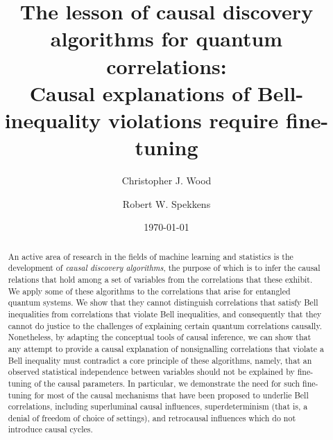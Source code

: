 \documentclass[letterpaper,onecolumn,nofootinbib]{revtex4}
\begin{document}
\title{The lesson of causal discovery algorithms for quantum correlations: \\ Causal explanations of Bell-inequality violations require fine-tuning}
\author{Christopher J. Wood}
\author{Robert W. Spekkens}
\date{\today}


\begin{abstract}
An active area of research in the fields of machine learning and statistics is the
development of \emph{causal discovery algorithms}, the purpose of which is
to infer the causal relations that hold among a set of variables from the
correlations that these exhibit. We apply some of these algorithms to the
correlations that arise for entangled quantum systems.  We show that they
cannot distinguish correlations that satisfy Bell inequalities from
correlations that violate Bell inequalities, and consequently that they cannot do
justice to the challenges of explaining certain quantum correlations
causally.  Nonetheless, by adapting the conceptual tools of causal inference, we can show that any attempt to provide a causal explanation of nonsignalling correlations that violate a Bell inequality must contradict a core
principle of these algorithms, namely, that an observed statistical
independence between variables should not be explained by fine-tuning of the
causal parameters.  In particular, we demonstrate the need for such fine-tuning for most of the causal mechanisms that have been proposed to underlie Bell correlations, including superluminal causal influences, superdeterminism (that is, a denial of freedom of choice of settings), and retrocausal influences which do not introduce causal cycles.
\end{abstract}

\maketitle


\end{document}
